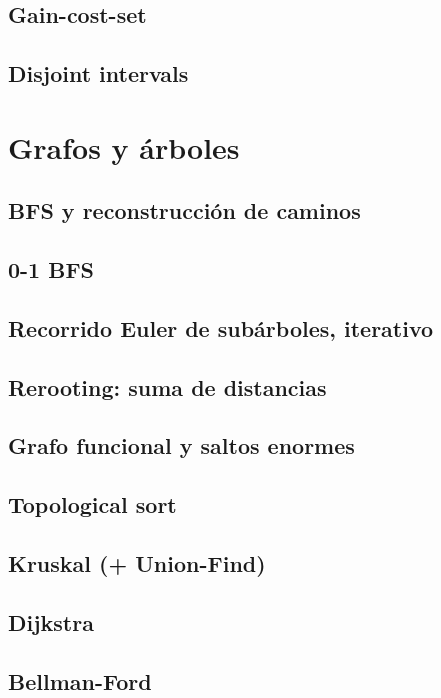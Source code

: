 \subsection{Gain-cost-set}
\subsection{Disjoint intervals}

\section{Grafos y árboles}
\subsection{BFS y reconstrucción de caminos}
\subsection{0-1 BFS}
\subsection{Recorrido Euler de subárboles, iterativo}
\subsection{Rerooting: suma de distancias}
\subsection{Grafo funcional y saltos enormes}
\subsection{Topological sort}
\subsection{Kruskal (+ Union-Find)}
\subsection{Dijkstra}
\subsection{Bellman-Ford}
